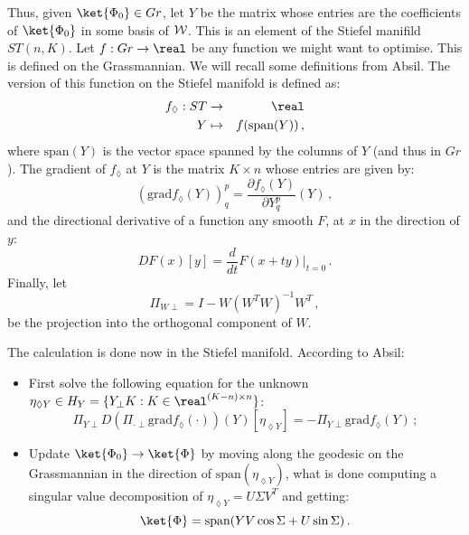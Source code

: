 \documentclass[a4paper,11pt]{article}
\begin{document}
Thus, given $\ket{\Phi_0} \in Gr$, let $Y$ be the matrix whose entries are the coefficients of $\ket{\Phi_0}$ in some basis of $\mathcal{W}{}$.
This is an element of the Stiefel manifild $ST(n,K)$.
Let $f : Gr \to \real$ be any function we might want to optimise.
This is defined on the Grassmannian.
We will recall some definitions from Absil.\cite{}
The version of this function on the Stiefel manifold is defined as:
\begin{eqnarray}
  f_{\lozenge} : ST &\to& \real\\
  Y &\mapsto& f(\text{span}(Y))\,,
\end{eqnarray}
where $\text{span}(Y)$ is the vector space spanned by the columns of $Y$ (and thus in $Gr$).
The gradient of $f_\lozenge$ at $Y$ is the matrix $K \times n$ whose entries are given by:
\begin{equation}
(\text{grad} f_\lozenge(Y))^p_q = \frac{\partial f_\lozenge(Y)}{\partial Y^p_q}(Y)\,,
\end{equation}
and the directional derivative of a function any smooth $F$, at $x$ in the direction of $y$:
\begin{equation}
  DF(x)[y] = \frac{d}{dt}F(x + ty)\big|_{t=0}\,.
\end{equation}
Finally, let
\begin{equation}
  \Pi_{W\perp} = I - W(W^TW)^{-1}W^T\,,
\end{equation}
be the projection into the orthogonal component of $W$.

The calculation is done now in the Stiefel manifold.
According to Absil:
\begin{itemize}
\item First solve the following equation for the unknown $\eta_{\lozenge Y} \in H_Y = \{Y_\perp K:K \in \real^{(K-n)\times n}\}$:
  \begin{equation}\label{eq:Absil_main_eq}
    \Pi_{Y\perp} D\left(\Pi_{\cdot{} \perp} \text{grad}f_\lozenge\left(\cdot{}\right) \right)
    \left(Y\right)\left[\eta_{\lozenge Y}\right] = -\Pi_{Y\perp}\text{grad}f_\lozenge\left(Y\right)\,;
  \end{equation}
\item Update $\ket{\Phi_0} \to \ket{\Phi}$ by moving along the geodesic on the Grassmannian in the direction of $\text{span}(\eta_{\lozenge Y})$, what is done computing a singular value decomposition of $\eta_{\lozenge Y} = U \Sigma V^T$ and getting:
  \begin{equation}
    \ket{\Phi} = \text{span}(Y V \cos \Sigma + U \sin \Sigma)\,.
  \end{equation}
\end{itemize}
\end{document}
